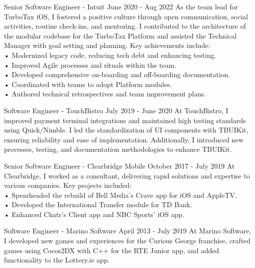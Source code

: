 \documentclass[
	10pt, %
]{FreemanCV}
\begin{document}
\begin{paracol}{2}

\jobentry
	{Senior Software Engineer - Intuit}
	{June 2020 - Aug 2022}
	{As the team lead for TurboTax iOS, I fostered a positive culture through open communication, social activities, routine check-ins, and mentoring. I contributed to the architecture of the modular codebase for the TurboTax Platform and assisted the Technical Manager with goal setting and planning. Key achievements include:\medskip\\
    • Modernized legacy code, reducing tech debt and enhancing testing.\\
    • Improved Agile processes and rituals within the team.\\
    • Developed comprehensive on-boarding and off-boarding documentation.\\
    • Coordinated with teams to adopt Platform modules.\\
    • Authored technical retrospectives and team improvement plans.}


\jobentry
	{Software Engineer - TouchBistro}
    {July 2019 - June 2020}
    {At TouchBistro, I improved payment terminal integrations and maintained high testing standards using Quick/Nimble. I led the standardization of UI components with TBUIKit, ensuring reliability and ease of implementation. Additionally, I introduced new processes, testing, and documentation methodologies to enhance TBUIKit.}


\jobentry
    {Senior Software Engineer - Clearbridge Mobile}
    {October 2017 - July 2019}
    {At Clearbridge, I worked as a consultant, delivering rapid solutions and expertise to various companies. Key projects included:\medskip\\
    • Spearheaded the rebuild of Bell Media’s Crave app for iOS and AppleTV.\\
    • Developed the International Transfer module for TD Bank.\\
    • Enhanced Chatr’s Client app and NBC Sports’ iOS app.}


\jobentry
    {Software Engineer - Marino Software}
    {April 2013 - July 2019}
    {At Marino Software, I developed new games and experiences for the Curious George franchise, crafted games using Cocos2DX with C++ for the RTE Junior app, and added functionality to the Lottery.ie app.}


\end{paracol}
\end{document}
